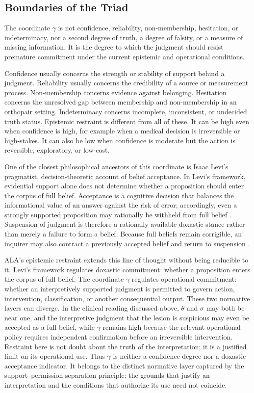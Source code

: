 \documentclass[reqno,final]{amsart}
\theoremstyle{definition}
\theoremstyle{plain}
\theoremstyle{remark}
\begin{document}
\subsection{Boundaries of the Triad}

The coordinate \(\gamma\) is not confidence, reliability, non-membership, hesitation, or indeterminacy, nor a second degree of truth, a degree of falsity, or a measure of missing information. It is the degree to which the judgment should resist premature commitment under the current epistemic and operational conditions.

Confidence usually concerns the strength or stability of support behind a judgment. Reliability usually concerns the credibility of a source or measurement process. Non-membership concerns evidence against belonging. Hesitation concerns the unresolved gap between membership and non-membership in an orthopair setting. Indeterminacy concerns incomplete, inconsistent, or undecided truth status. Epistemic restraint is different from all of these. It can be high even when confidence is high, for example when a medical decision is irreversible or high-stakes. It can also be low when confidence is moderate but the action is reversible, exploratory, or low-cost.

One of the closest philosophical ancestors of this coordinate is Isaac Levi's pragmatist, decision-theoretic account of belief acceptance. In Levi's framework, evidential support alone does not determine whether a proposition should enter the corpus of full belief. Acceptance is a cognitive decision that balances the informational value of an answer against the risk of error; accordingly, even a strongly supported proposition may rationally be withheld from full belief \cite{LeviGamblingTruth1967,LeviEnterprise1980}. Suspension of judgment is therefore a rationally available doxastic stance rather than merely a failure to form a belief. Because full beliefs remain corrigible, an inquirer may also contract a previously accepted belief and return to suspension \cite{LeviMildContraction2004}.

ALA's epistemic restraint extends this line of thought without being reducible to it. Levi's framework regulates doxastic commitment: whether a proposition enters the corpus of full belief. The coordinate \(\gamma\) regulates operational commitment: whether an interpretively supported judgment is permitted to govern action, intervention, classification, or another consequential output. These two normative layers can diverge. In the clinical reading discussed above, \(\theta\) and \(\sigma\) may both be near one, and the interpretive judgment that the lesion is suspicious may even be accepted as a full belief, while \(\gamma\) remains high because the relevant operational policy requires independent confirmation before an irreversible intervention. Restraint here is not doubt about the truth of the interpretation; it is a justified limit on its operational use. Thus \(\gamma\) is neither a confidence degree nor a doxastic acceptance indicator. It belongs to the distinct normative layer captured by the support--permission separation principle: the grounds that justify an interpretation and the conditions that authorize its use need not coincide.
\end{document}
